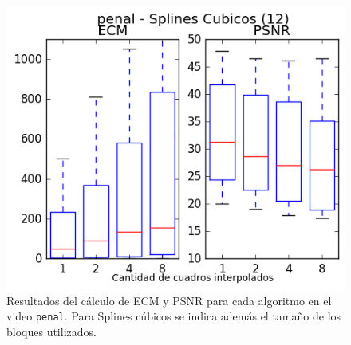 \begin{figure}[H]
\begin{minipage}{0.33\textwidth}
    \includegraphics[width=1\textwidth]{imgs/resultados_error/penal_4.png} 
\end{minipage}
\caption{\footnotesize Resultados del cálculo de ECM y PSNR para cada algoritmo en el video \texttt{penal}. Para Splines cúbicos se indica además el tamaño de los bloques utilizados.}
\end{figure}

